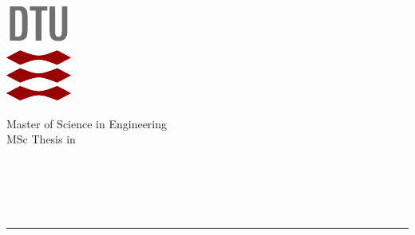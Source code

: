 \begin{titlepage}
    \begin{spacing}{1}
    
    \begin{minipage}[b]{0.12\textwidth}
        \includegraphics[width=\textwidth]{frontmatter/front_gfx/dtu_logo.pdf}
    \end{minipage}%
    \begin{minipage}[b]{0.88\textwidth}
        \raggedleft%
        \large
        Master of Science in Engineering\\MSc Thesis in \thestudyprogram\vspace{1.7cm}
    \end{minipage}


    \raggedright%
    {\Huge\TitleFont\thesistitle}\\
    \vspace{1cm}
    {\huge\titlefont\thesisauthor}


    {\titlefont\department\\\textcolor{departmentgrey}{\titlefont\departmentdescriber}\\\hspace{0.3mm}\textcolor{dtured}{\rule{3.2cm}{1.2mm}}}
    
    \end{spacing}
\end{titlepage}